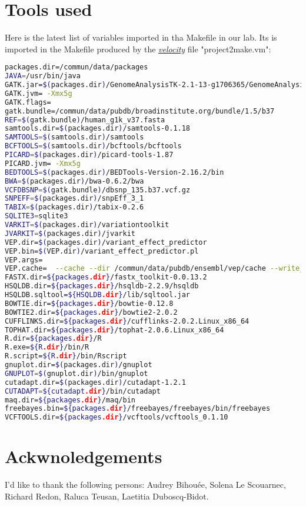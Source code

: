 \documentclass{article}
\newcommand{\velocity}{\href{http://velocity.apache.org/}{\em{velocity}}}
\begin{document}
\section{Tools used}
Here is the latest list of variables imported in tha Makefile in our lab. Its is imported in the Makefile produced by the \velocity{} file "project2make.vm":
\begin{lstlisting}[language=bash]
packages.dir=/commun/data/packages
JAVA=/usr/bin/java
GATK.jar=$(packages.dir)/GenomeAnalysisTK-2.1-13-g1706365/GenomeAnalysisTK.jar
GATK.jvm= -Xmx5g
GATK.flags=
gatk.bundle=/commun/data/pubdb/broadinstitute.org/bundle/1.5/b37
REF=$(gatk.bundle)/human_g1k_v37.fasta
samtools.dir=$(packages.dir)/samtools-0.1.18
SAMTOOLS=$(samtools.dir)/samtools 
BCFTOOLS=$(samtools.dir)/bcftools/bcftools
PICARD=$(packages.dir)/picard-tools-1.87
PICARD.jvm= -Xmx5g 
BEDTOOLS=$(packages.dir)/BEDTools-Version-2.16.2/bin
BWA=$(packages.dir)/bwa-0.6.2/bwa
VCFDBSNP=$(gatk.bundle)/dbsnp_135.b37.vcf.gz
SNPEFF=$(packages.dir)/snpEff_3_1
TABIX=$(packages.dir)/tabix-0.2.6
SQLITE3=sqlite3
VARKIT=$(packages.dir)/variationtoolkit
JVARKIT=$(packages.dir)/jvarkit
VEP.dir=$(packages.dir)/variant_effect_predictor
VEP.bin=$(VEP.dir)/variant_effect_predictor.pl
VEP.args=
VEP.cache=  --cache --dir /commun/data/pubdb/ensembl/vep/cache --write_cache
FASTX.dir=${packages.dir}/fastx_toolkit-0.0.13.2
HSQLDB.dir=${packages.dir}/hsqldb-2.2.9/hsqldb
HSQLDB.sqltool=${HSQLDB.dir}/lib/sqltool.jar
BOWTIE.dir=${packages.dir}/bowtie-0.12.8
BOWTIE2.dir=${packages.dir}/bowtie2-2.0.2
CUFFLINKS.dir=${packages.dir}/cufflinks-2.0.2.Linux_x86_64
TOPHAT.dir=${packages.dir}/tophat-2.0.6.Linux_x86_64
R.dir=${packages.dir}/R
R.exe=${R.dir}/bin/R
R.script=${R.dir}/bin/Rscript
gnuplot.dir=$(packages.dir)/gnuplot            
GNUPLOT=$(gnuplot.dir)/bin/gnuplot
cutadapt.dir=$(packages.dir)/cutadapt-1.2.1
CUTADAPT=${cutadapt.dir}/bin/cutadapt
maq.dir=${packages.dir}/maq/bin
freebayes.bin=${packages.dir}/freebayes/freebayes/bin/freebayes
VCFTOOLS.dir=${packages.dir}/vcftools/vcftools_0.1.10
\end{lstlisting}

\section{Ackwnoledgements}
I'd like to thank the following persons:  Audrey Bihouée, Solena Le Scouarnec, Richard Redon, Raluca Teusan, Laetitia Duboscq-Bidot.
\end{document}
